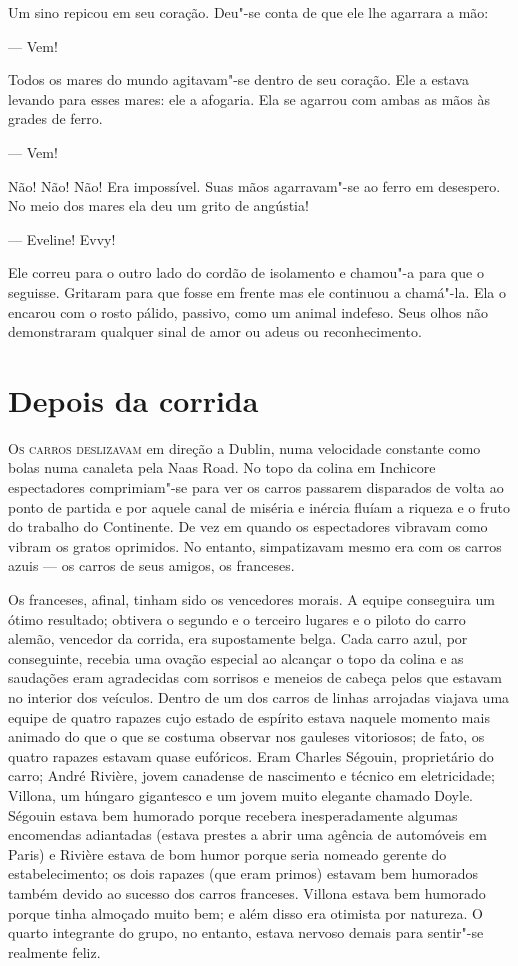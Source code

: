 Um sino repicou em seu coração.  Deu"-se conta de que ele lhe agarrara a mão:

--- Vem!

Todos os mares do mundo agitavam"-se dentro de seu coração.  Ele a estava
levando para esses mares: ele a afogaria.  Ela se agarrou com ambas as mãos às
grades de ferro.

--- Vem!

Não! Não! Não!  Era impossível.  Suas mãos agarravam"-se ao ferro em desespero.
No meio dos mares ela deu um grito de angústia!

--- Eveline!  Evvy!

Ele correu para o outro lado do cordão de isolamento e chamou"-a para que o
seguisse.  Gritaram para que fosse em frente mas ele continuou a chamá"-la.  Ela
o encarou com o rosto pálido, passivo, como um animal indefeso.  Seus olhos não
demonstraram qualquer sinal de amor ou adeus ou reconhecimento.


\chapter{Depois da corrida}

\textsc{Os carros deslizavam} em direção a Dublin, numa velocidade constante
como bolas numa canaleta pela Naas Road.  No topo da colina em Inchicore
espectadores comprimiam"-se para ver os carros passarem disparados de volta ao
ponto de partida e por aquele canal de miséria e inércia fluíam a riqueza e o
fruto do trabalho do Continente.  De vez em quando os espectadores vibravam
como vibram os gratos oprimidos.  No entanto, simpatizavam mesmo era com os
carros azuis --- os carros de seus amigos, os franceses.

Os franceses, afinal, tinham sido os vencedores morais.  A equipe conseguira um
ótimo resultado; obtivera o segundo e o terceiro lugares e o piloto do carro
alemão, vencedor da corrida, era supostamente belga.  Cada carro azul, por
conseguinte, recebia uma ovação especial ao alcançar o topo da colina e as
saudações eram agradecidas com sorrisos e meneios de cabeça pelos que estavam
no interior dos veículos.  Dentro de um dos carros de linhas arrojadas viajava
uma equipe de quatro rapazes cujo estado de espírito estava naquele momento
mais animado do que o que se costuma observar nos gauleses vitoriosos; de fato,
os quatro rapazes estavam quase eufóricos.  Eram Charles Ségouin, proprietário
do carro; André Rivière, jovem canadense de nascimento e técnico em
eletricidade; Villona, um húngaro gigantesco e um jovem muito elegante chamado
Doyle.  Ségouin estava bem humorado porque recebera inesperadamente algumas
encomendas adiantadas (estava prestes a abrir uma agência de automóveis em
Paris) e Rivière estava de bom humor porque seria nomeado gerente do
estabelecimento; os dois rapazes (que eram primos) estavam bem humorados também
devido ao sucesso dos carros franceses.  Villona estava bem humorado porque
tinha almoçado muito bem; e além disso era otimista por natureza.  O quarto
integrante do grupo, no entanto, estava nervoso demais para sentir"-se realmente
feliz.

